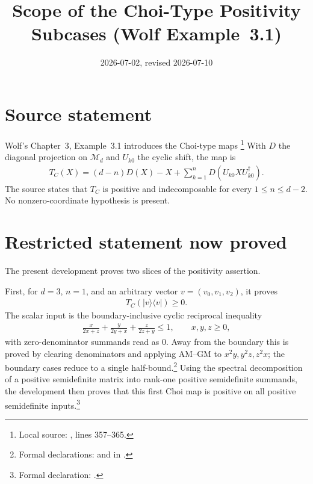 \documentclass{article}
\title{Scope of the Choi-Type Positivity Subcases (Wolf Example~3.1)}
\author{}
\date{2026-07-02, revised 2026-07-10}
\begin{document}
\maketitle
{}

\section{Source statement}

Wolf's Chapter~3, Example~3.1 introduces the Choi-type maps
\cite{Wolf2012Quantum}\footnote{Local source:
, lines
357--365.}  With \(D\) the diagonal projection on \(\mathcal M_d\) and
\(U_{k0}\) the cyclic shift, the map is
\begin{align}
  T_C(X)
  =(d-n)D(X)-X+\sum_{k=1}^{n}D(U_{k0}XU_{k0}^{\dagger}).
  \tag{3.20}
\end{align}
The source states that \(T_C\) is positive and indecomposable for every
\(1\le n\le d-2\).  No nonzero-coordinate hypothesis is present.

\section{Restricted statement now proved}

The present development proves two slices of the positivity assertion.

First, for \(d=3\), \(n=1\), and an arbitrary vector \(v=(v_0,v_1,v_2)\), it
proves
\begin{align}
  T_C(|v\rangle\langle v|)\ge 0.
\end{align}
The scalar input is the boundary-inclusive cyclic reciprocal inequality
\begin{align}
  \frac{x}{2x+z}+\frac{y}{2y+x}+\frac{z}{2z+y}\le 1,
  \qquad x,y,z\ge 0,
\end{align}
with zero-denominator summands read as \(0\).  Away from the boundary this is
proved by clearing denominators and applying AM--GM to \(x^2y,y^2z,z^2x\); the
boundary cases reduce to a single half-bound.\footnote{Formal declarations:
 and
in .}
Using the spectral decomposition of a positive semidefinite matrix into
rank-one positive semidefinite summands, the development then proves that this
first Choi map is positive on all positive semidefinite inputs.\footnote{Formal
declaration: .}
\end{document}
